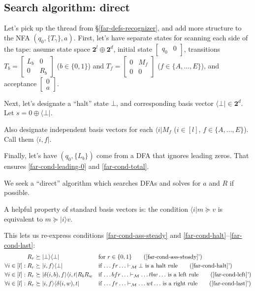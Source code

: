 \subsection{Search algorithm: direct}
\label{far-algo-direct}
Let's pick up the thread from \S\ref{far-defs-recognizer}, %
and add more structure to the NFA $(q_0, \{T_\gamma\}, a)$.
First, let's have separate states for scanning each side of the tape:
assume state space $\mathbf{2}^l \oplus \mathbf{2}^d$,
initial state $\begin{bmatrix}q_0&0\end{bmatrix}$,
transitions
 $T_b=\begin{bmatrix}L_b&0\\0&R_b\end{bmatrix}$ ($b\in\{0,1\}$) and
 $T_f=\begin{bmatrix}0&M_f\\0&0\end{bmatrix}$ ($f\in\{A,\ldots,E\}$),
and acceptance $\begin{bmatrix}0\\a\end{bmatrix}$.

Next, let's designate a ``halt'' state $\bot$, and corresponding basis vector $\langle\bot\vert\in\mathbf{2}^d$.
Let $s=0\oplus\langle\bot\vert$.

Also designate independent basis vectors for each $\langle i\vert M_f$ ($i\in[l]$, $f\in\{A,\ldots,E\}$).
Call them $\langle i,f\vert$.

Finally, let's have $(q_0,\{L_b\})$ come from a DFA that ignores leading zeros.
That ensures \eqref{far-cond-leading-0} and \eqref{far-cond-total}.

We seek a ``direct'' algorithm which searches DFAs and solves for $a$ and $R$ if possible.

A helpful property of standard basis vectors is: the condition $\langle i\vert m\succeq v$ is equivalent to $m\succeq\vert i\rangle v$.

This lets us re-express conditions \eqref{far-cond-ass-steady} and \eqref{far-cond-halt}--\eqref{far-cond-last}:
\begin{align}
  R_r &\succeq \vert\bot\rangle \langle\bot\vert
  &&\text{for }r\in\{0,1\}
  \tag{\ref{far-cond-ass-steady}'}
  \\
  \forall i\in[l]: R_r &\succeq \vert i,f\rangle \langle\bot\vert
  &&\text{if $\ldots fr\ldots\vdash_\mathcal{M}\bot$ is a halt rule}
  \tag{\ref{far-cond-halt}'}
  \\
  \forall i\in[l]: R_r &\succeq \vert\delta(i,b),f\rangle \langle i,t\vert R_b R_w
  &&\text{if $\ldots bfr\ldots\vdash_\mathcal{M}\ldots tbw\ldots$ is a left rule}
  \tag{\ref{far-cond-left}'}
  \\
  \forall i\in[l]: R_r &\succeq \vert i,f\rangle \langle \delta(i,w),t\vert
  &&\text{if $\ldots fr\ldots\vdash_\mathcal{M}\ldots wt\ldots$ is a right rule}
  \tag{\ref{far-cond-last}'}
\end{align}

